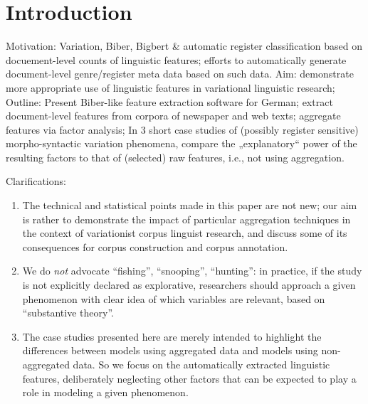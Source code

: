 \section{Introduction}

Motivation: Variation, Biber, Bigbert \& automatic register classification based on docuement-level counts of linguistic features; efforts to automatically generate document-level genre/register meta data based on such data.
Aim: demonstrate more appropriate use of linguistic features in variational linguistic research;
Outline: Present Biber-like feature extraction software for German; extract document-level features from corpora of newspaper and web texts; aggregate features via factor analysis; 
In 3 short case studies of (possibly register sensitive) morpho-syntactic variation phenomena, compare the „explanatory“ power of the resulting factors to that of (selected) raw features, i.e., not using aggregation. 

Clarifications:
\begin{enumerate}
  \item The technical and statistical points made in this paper are not new; our aim is rather to demonstrate the impact of particular aggregation techniques in the context of variationist corpus linguist research, and discuss some of its consequences for corpus construction and corpus annotation.  

  \item We do \textit{not} advocate ``fishing'', ``snooping'', ``hunting'': in practice, if the  study is not explicitly declared as explorative, researchers should approach a given phenomenon with clear idea of which variables are relevant, based on ``substantive theory''.

  \item The case studies presented here are merely intended to highlight the differences between models using aggregated data and models using non-aggregated data. So we focus on the automatically extracted linguistic features, deliberately neglecting other factors that can be expected to play a role in modeling a given phenomenon.
\end{enumerate}
